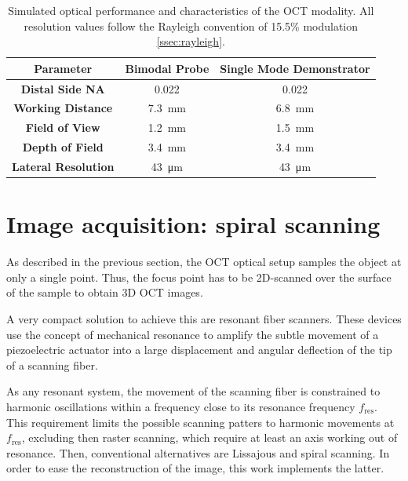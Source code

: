 \begin{table}[h!]\centering
	\caption{Simulated optical performance and characteristics of the OCT modality. All resolution values follow the Rayleigh convention of 15.5\% modulation \autoref{ssec:rayleigh}.}
	\begin{tabular}{ccc}\\
		\textbf{Parameter} & \textbf{Bimodal Probe} & \textbf{Single Mode Demonstrator} \\ 
		\hline
		\textbf{Distal Side NA} & 0.022 & 0.022 \\ 
		\textbf{Working Distance} & \SI{7.3}{\milli\meter} &  \SI{6.8}{\milli\meter} \\ 
		\textbf{Field of View} & \SI{1.2}{\milli\meter} &  \SI{1.5}{\milli\meter}\\ 
		\textbf{Depth of Field} & \SI{3.4}{\milli\meter}& \SI{3.4}{\milli\meter} \\ 
		\textbf{Lateral Resolution} & \SI{43}{\micro\meter} & \SI{43}{\micro\meter}\\ 
		\hline
	\end{tabular} 
    \label{tab:simRes}
\end{table}

\section{Image acquisition: spiral scanning}
\label{sec:spiralScanning}

As described in the previous section, the OCT optical setup samples the object at only a single point. Thus, the focus point has to be 2D-scanned over the surface of the sample to obtain 3D OCT images.

A very compact solution to achieve this are resonant fiber scanners. These devices use the concept of mechanical resonance to amplify the subtle movement of a piezoelectric actuator into a large displacement and angular deflection of the tip of a scanning fiber. 

As any resonant system, the movement of the scanning fiber is constrained to harmonic oscillations within a frequency close to its resonance frequency $f_\mathrm{res}$. This requirement limits the possible scanning patters to harmonic movements at $f_\mathrm{res}$, excluding then raster scanning, which require at least an axis working out of resonance. Then, conventional alternatives are Lissajous \cite{Moon2010} and spiral scanning. In order to ease the reconstruction of the image, this work implements the latter.

